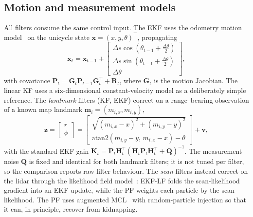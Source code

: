 \documentclass[conference]{IEEEtran}
\begin{document}
\subsection{Motion and measurement models}
All filters consume the same control input. The EKF uses the odometry motion model~\cite{Thrun2005} on the unicycle state $\mathbf{x}=(x,y,\theta)^\top$, propagating
\begin{equation}
\mathbf{x}_t = \mathbf{x}_{t-1} +
\begin{bmatrix} \Delta s\cos(\theta_{t-1}+\tfrac{\Delta\theta}{2})\\ \Delta s\sin(\theta_{t-1}+\tfrac{\Delta\theta}{2})\\ \Delta\theta \end{bmatrix},
\end{equation}
with covariance $\mathbf{P}_t=\mathbf{G}_t\mathbf{P}_{t-1}\mathbf{G}_t^\top+\mathbf{R}_t$, where $\mathbf{G}_t$ is the motion Jacobian. The linear KF uses a six-dimensional constant-velocity model as a deliberately simple reference. The \emph{landmark} filters (KF, EKF) correct on a range--bearing observation of a known map landmark $\mathbf{m}_i=(m_{i,x},m_{i,y})$,
\begin{equation}
\mathbf{z}=\begin{bmatrix} r \\ \phi \end{bmatrix}=
\begin{bmatrix} \sqrt{(m_{i,x}-x)^2+(m_{i,y}-y)^2} \\ \mathrm{atan2}(m_{i,y}-y,\,m_{i,x}-x)-\theta \end{bmatrix}+\mathbf{v},
\end{equation}
with the standard EKF gain $\mathbf{K}_t=\mathbf{P}_t\mathbf{H}_t^\top(\mathbf{H}_t\mathbf{P}_t\mathbf{H}_t^\top+\mathbf{Q})^{-1}$. The measurement noise $\mathbf{Q}$ is fixed and identical for both landmark filters; it is not tuned per filter, so the comparison reports raw filter behaviour. The \emph{scan} filters instead correct on the lidar through the likelihood field model~\cite{Thrun2005}: EKF-LF folds the scan-likelihood gradient into an EKF update, while the PF weights each particle by the scan likelihood. The PF uses augmented MCL~\cite{Thrun2005} with random-particle injection so that it can, in principle, recover from kidnapping.
\end{document}
